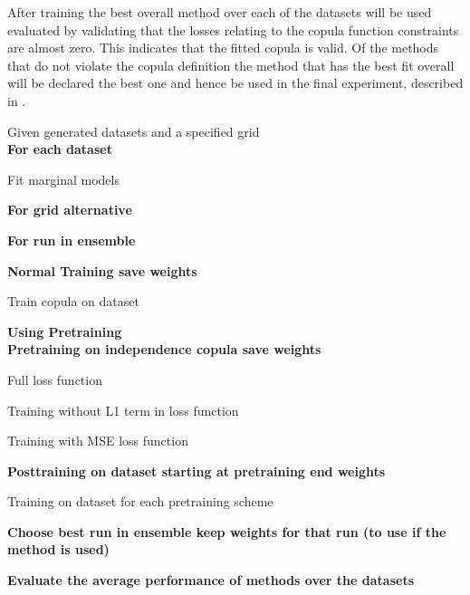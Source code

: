 After training the best overall method over each of the datasets will be used evaluated by validating that the losses relating to the copula function constraints are almost zero. This indicates that the fitted copula is valid. Of the methods that do not violate the copula definition the method that has the best fit overall will be declared the best one and hence be used in the final experiment, described in .  

\begin{generalinstructions}
Given generated datasets and a specified grid\\
\textbf{For each dataset}
\begin{compactitem}
    \item Fit marginal models
    \item \textbf{For grid alternative}
    \begin{compactitem}
        \item \textbf{For run in ensemble}
        \begin{compactitem}
            \item \textbf{Normal Training save weights} 
            \begin{compactitem}
                \item Train copula on dataset
            \end{compactitem}
            \item \textbf{Using Pretraining}\\
            \textbf{Pretraining on independence copula save weights}
            \begin{compactitem}             
                \item Full loss function
                \item Training without L1 term in loss function
                \item Training with MSE loss function
            \end{compactitem}
            \textbf{Posttraining on dataset starting at pretraining end weights}
            \begin{compactitem}             
                \item Training on dataset for each pretraining scheme
            \end{compactitem}
        \end{compactitem}
        \item \textbf{Choose best run in ensemble keep weights for that run (to use if the method is used)}
    \end{compactitem}
\end{compactitem}
\textbf{Evaluate the average performance of methods over the datasets}
\end{generalinstructions}



